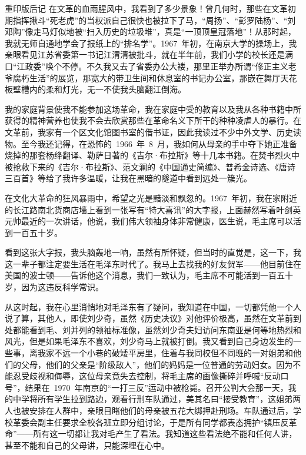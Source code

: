 \begin{pre-post-text}{重印版后记}
在文革的血雨腥风中，我看到了多少景象！曾几何时，那些在文革初期指挥揪斗“死老虎”的当权派自己很快也被拉下了马，“周扬”、“彭罗陆杨”、“刘邓陶”像走马灯似地被“扫入历史的垃圾堆”，真是“一顶顶皇冠落地”！从那时起，我就无师自通地学会了报纸上的“排名学”。1967~年初，在南京大学的操场上，我亲眼看见江苏省委第一书记江渭清被批斗，就在半年前，我们小学的校长还是满口“江政委”唤个不停。不久我又去了省委办公大褛，那里正举办所谓“修正主义老爷腐朽生活”的展览，那宽大的带卫生间和休息室的书记办公室，那嵌在舞厅天花板壁槽内的柔和灯光，无一不使我头脑翻江倒海。

我的家庭背景使我不能参加这场革命，我在家庭中受的教育以及我从各种书籍中所获得的精神营养也使我不会去欣赏那些在革命名义下所干的种种凌虐人的暴行。在文革前，我家有一个区文化馆图书室的借书证，因此我读过不少中外文学、历史读物。至今我还记得，在恐怖的~1966~年~8~月，我如何从母亲的手中夺下她正准备烧掉的那套杨绛翻译、勒萨日著的《吉尔·布拉斯》等十几本书籍。在焚书烈火中被抢救下来的《吉尔·布拉斯》、范文澜的《中国通史简编》、普希金诗选、《唐诗三百首》等给了我许多温暖，让我在黑暗的隧道中看到远处一簇光。

在文化大革命的狂风暴雨中，希望之光是黯淡和飘忽的。1967~年初，我在家附近的长江路南北货商店墙上看到一张写有“特大喜讯”的大字报，上面赫然写着叶剑英元帅最近的一次讲话，他说，我们伟大领袖身体非常健康，医生说，毛主席可以活到一百五十岁。

看到这张大字报，我头脑轰地一响，虽然有所怀疑，但当时的直觉是，这一下，我这一辈子都注定要生活在毛泽东时代了。我马上去找我的好友贺军——他目前住在美国的波士顿——告诉他这个消息，我们一致认为，毛主席不可能活到一百五十岁，因为这违反科学常识。

从这时起，我在心里消悄地对毛泽东有了疑问，我知道在中国，一切都凭他一个人说了算，其他人，即使刘少奇，虽然《历史决议》对他评价极高，虽然在文革前到处都能看到毛、刘并列的领袖标准像，虽然刘少奇夫妇访问东南亚是何等地热烈和风光，但是如果毛泽东不喜欢，刘少奇马上就被打倒。我又看到自己身边发生的一些事，离我家不远一个小巷的破矮平房里，住着与我同校但不同班的一对姐弟和他们的父母，他们的父亲是“阶级敌人”，他们的妈妈是一位普通的劳动妇女。因为不能忍受歧视和侮辱，这位母亲竟失去控制，将毛主席的画像撕碎并呼喊“反动口号”，结果在~1970~年南京的“一打三反”运动中被枪毙。召开公判大会那一天，我的中学将所有学生拉到路边，观看行刑车队通过，美其名曰“接受教育”，这姐弟两人也被安排在人群中，亲眼目睹他们的母亲被五花大绑押赴刑场。车队通过后，学校革委会副主任要求全校各班立即分组讨论，于是所有同学都表态拥护“镇压反革命”——所有这一切都让我对毛产生了看法。我知道这些看法绝不能和任何人讲，甚至不能和自己的父母讲，只能深埋在心中。


\end{pre-post-text}
